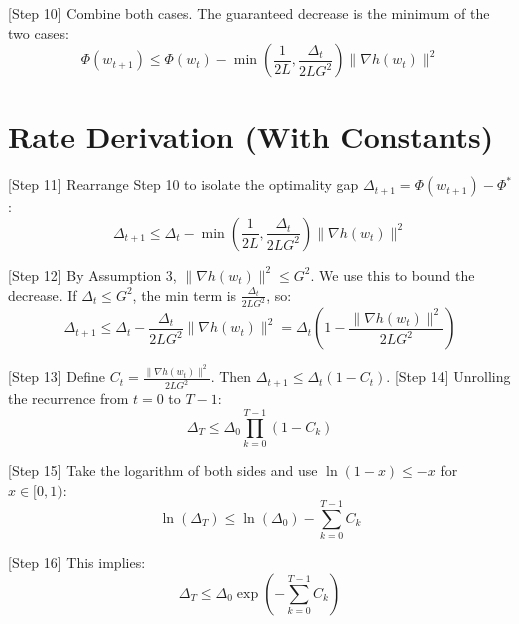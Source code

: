 \documentclass{article}
\begin{document}
[Step 10] Combine both cases. The guaranteed decrease is the minimum of the two cases:
\begin{equation}
    \Phi(w_{t+1}) \leq \Phi(w_t) - \min\left( \frac{1}{2L}, \frac{\Delta_t}{2 L G^2} \right) \|\nabla h(w_t)\|^2
\end{equation}

\section*{Rate Derivation (With Constants)}
[Step 11] Rearrange Step 10 to isolate the optimality gap $\Delta_{t+1} = \Phi(w_{t+1}) - \Phi^*$:
\begin{equation}
    \Delta_{t+1} \leq \Delta_t - \min\left( \frac{1}{2L}, \frac{\Delta_t}{2 L G^2} \right) \|\nabla h(w_t)\|^2
\end{equation}

[Step 12] By Assumption 3, $\|\nabla h(w_t)\|^2 \leq G^2$. We use this to bound the decrease. If $\Delta_t \leq G^2$, the min term is $\frac{\Delta_t}{2LG^2}$, so:
\begin{equation}
    \Delta_{t+1} \leq \Delta_t - \frac{\Delta_t}{2 L G^2} \|\nabla h(w_t)\|^2 = \Delta_t \left( 1 - \frac{\|\nabla h(w_t)\|^2}{2 L G^2} \right)
\end{equation}

[Step 13] Define $C_t = \frac{\|\nabla h(w_t)\|^2}{2 L G^2}$. Then $\Delta_{t+1} \leq \Delta_t (1 - C_t)$.
[Step 14] Unrolling the recurrence from $t=0$ to $T-1$:
\begin{equation}
    \Delta_T \leq \Delta_0 \prod_{k=0}^{T-1} (1 - C_k)
\end{equation}

[Step 15] Take the logarithm of both sides and use $\ln(1-x) \leq -x$ for $x \in [0,1)$:
\begin{equation}
    \ln(\Delta_T) \leq \ln(\Delta_0) - \sum_{k=0}^{T-1} C_k
\end{equation}

[Step 16] This implies:
\begin{equation}
    \Delta_T \leq \Delta_0 \exp\left( - \sum_{k=0}^{T-1} C_k \right)
\end{equation}
\end{document}
